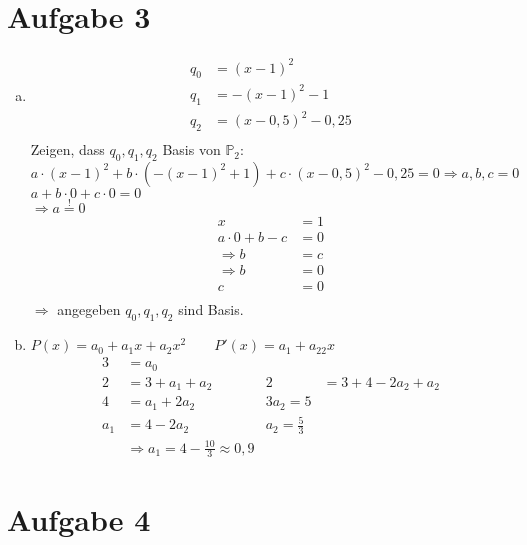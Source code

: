 \documentclass[11pt,a4paper]{article}
\newcommand{\Aufgabe}[1]{\section*{Aufgabe #1}}
\begin{document}
    \Aufgabe{3}

      \begin{enumerate}[a)]
        \item
        \begin{align*}
            q_0&=(x-1)^2\\
            q_1&=-(x-1)^2-1\\
            q_2&=(x-0,5)^2-0,25\\
        \end{align*}
        Zeigen, dass $q_0,q_1,q_2$ Basis von $\mathbb{P}_2$:\\
        $a\cdot(x-1)^2+b\cdot\left(-(x-1)^2+1\right)+c\cdot(x-0,5)^2-0,25=0\Rightarrow a,b,c=0$\\
        $a+b\cdot 0+c\cdot 0=0$\\
        $\Rightarrow a\stackrel{!}{=}0$\\
        \begin{align*}
          x&=1\\
          a\cdot 0+b-c&=0\\
          \Rightarrow b&=c\\
          \Rightarrow b&=0\\
          c&=0\\
        \end{align*}
        $\Rightarrow$ angegeben $q_0,q_1,q_2$ sind Basis.
        \item
        $P(x)=a_0+a_1x+a_2x^2\qquad P'(x)=a_1+a_22x$\\
        \begin{align*}
          3&=a_0\\
          2&=3+a_1+a_2 & 2&=3+4-2a_2+a_2\\
          4&=a_1+2a_2 & 3a_2=5\\
          a_1&=4-2a_2 & a_2=\frac{5}{3}\\
          &\Rightarrow a_1=4-\frac{10}{3}\approx 0,9
        \end{align*}
      \end{enumerate}
      \newpage

      \Aufgabe{4}
\end{document}
